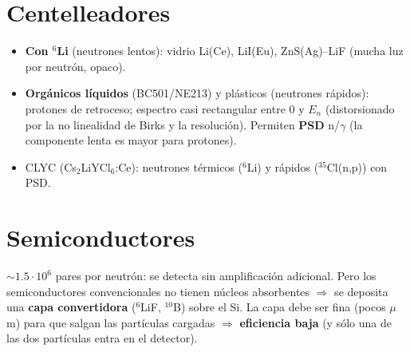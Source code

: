 \section{Centelleadores}
\begin{itemize}
\item \textbf{Con $^6$Li} (neutrones lentos): vidrio Li(Ce), LiI(Eu), ZnS(Ag)--LiF (mucha luz por neutrón, opaco).
\item \textbf{Orgánicos líquidos} (BC501/NE213) y plásticos (neutrones rápidos): protones de retroceso; espectro casi rectangular entre 0 y $E_n$
(distorsionado por la no linealidad de Birks y la resolución). Permiten \textbf{PSD} n/$\gamma$ (la componente lenta es mayor para protones).
\item CLYC (Cs$_2$LiYCl$_6$:Ce): neutrones térmicos ($^6$Li) y rápidos ($^{35}$Cl(n,p)) con PSD.
\end{itemize}

\section{Semiconductores}
$\sim1.5\cdot10^6$ pares por neutrón: se detecta sin amplificación adicional. Pero los semiconductores convencionales no tienen
núcleos absorbentes $\Rightarrow$ se deposita una \textbf{capa convertidora} ($^6$LiF, $^{10}$B) sobre el Si. La capa debe ser fina (pocos $\mu$m)
para que salgan las partículas cargadas $\Rightarrow$ \textbf{eficiencia baja} (y sólo una de las dos partículas entra en el detector).

